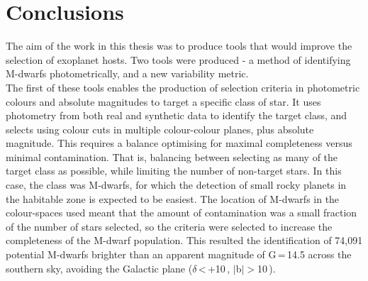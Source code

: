 \chapter{Conclusions}
The aim of the work in this thesis was to produce tools that would improve the selection of exoplanet hosts. Two tools were produced - a method of identifying M-dwarfs photometrically, and a new variability metric.\\

The first of these tools enables the production of selection criteria in photometric colours and absolute magnitudes to target a specific class of star. It uses photometry from both real and synthetic data to identify the target class, and selects using colour cuts in multiple colour-colour planes, plus absolute magnitude. This requires a balance optimising for maximal completeness versus minimal contamination. That is, balancing between selecting as many of the target class as possible, while limiting the number of non-target stars. In this case, the class was M-dwarfs, for which the detection of small rocky planets in the habitable zone is expected to be easiest. The location of M-dwarfs in the colour-spaces used meant that the amount of contamination was a small fraction of the number of stars selected, so the criteria were selected to increase the completeness of the M-dwarf population. This resulted the identification of 74,091 potential M-dwarfs brighter than an apparent magnitude of G\,=\,14.5 across the southern sky, avoiding the Galactic plane ($\delta$\,\textless\,+10\,\degree, $|$b$|>$10\,\degree).\\

